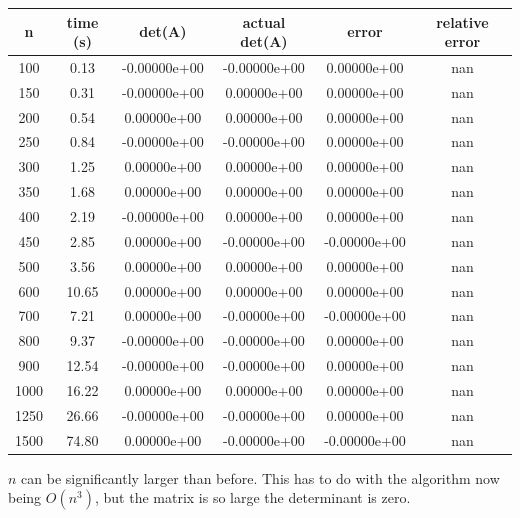 \documentclass[12pt]{article}
\newenvironment{problem}[2][Problem]{\begin{trivlist}
\item[\hskip \labelsep {\bfseries #1}\hskip \labelsep {\bfseries #2.}]}{\end{trivlist}}
\begin{document}
\begin{tabular}{ c | c | c | c | c | c }
n & time (s) & det(A) & actual det(A) & error & relative error \\
\hline
100 & 0.13 & -0.00000e+00 & -0.00000e+00 & 0.00000e+00 & nan \\
150 & 0.31 & -0.00000e+00 & 0.00000e+00 & 0.00000e+00 & nan \\
200 & 0.54 & 0.00000e+00 & 0.00000e+00 & 0.00000e+00 & nan \\
250 & 0.84 & -0.00000e+00 & -0.00000e+00 & 0.00000e+00 & nan \\
300 & 1.25 & 0.00000e+00 & 0.00000e+00 & 0.00000e+00 & nan \\
350 & 1.68 & 0.00000e+00 & 0.00000e+00 & 0.00000e+00 & nan \\
400 & 2.19 & -0.00000e+00 & 0.00000e+00 & 0.00000e+00 & nan \\
450 & 2.85 & 0.00000e+00 & -0.00000e+00 & -0.00000e+00 & nan \\
500 & 3.56 & 0.00000e+00 & 0.00000e+00 & 0.00000e+00 & nan \\
600 & 10.65 & 0.00000e+00 & 0.00000e+00 & 0.00000e+00 & nan \\
700 & 7.21 & 0.00000e+00 & -0.00000e+00 & -0.00000e+00 & nan \\
800 & 9.37 & -0.00000e+00 & -0.00000e+00 & 0.00000e+00 & nan \\
900 & 12.54 & -0.00000e+00 & -0.00000e+00 & 0.00000e+00 & nan \\
1000 & 16.22 & 0.00000e+00 & 0.00000e+00 & 0.00000e+00 & nan \\
1250 & 26.66 & -0.00000e+00 & -0.00000e+00 & 0.00000e+00 & nan \\
1500 & 74.80 & 0.00000e+00 & -0.00000e+00 & -0.00000e+00 & nan \\
\end{tabular}
\newline
\newline

$n$ can be significantly larger than before. This has to do with the algorithm now
being $O(n^3)$, but the matrix is so large the determinant is zero.
\\

\begin{problem}{3}
\end{problem}
\end{document}
